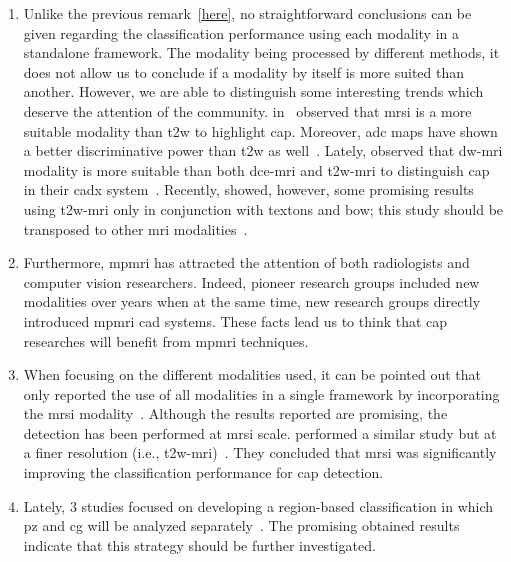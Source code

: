 \begin{enumerate}
\item Unlike the previous remark~\ref{here}, no straightforward conclusions can
  be given regarding the classification performance using each modality in a
  standalone framework.
  The modality being processed by different methods, it does not allow us to
  conclude if a modality by itself is more suited than another.
  However, we are able to distinguish some interesting trends which deserve the
  attention of the community.
  \citeauthor{Tiwari2013} in~\cite{Tiwari2009a,Tiwari2012,Tiwari2013} observed
  that \ac{mrsi} is a more suitable modality than \ac{t2w} to highlight
  \ac{cap}.
  Moreover, \ac{adc} maps have shown a better discriminative power than \ac{t2w}
  as well~\cite{Langer2009,Viswanath2011,Peng2013}.
  Lately, \citeauthor{Litjens2014} observed that \ac{dw}-\ac{mri} modality is
  more suitable than both \ac{dce}-\ac{mri} and \ac{t2w}-\ac{mri} to distinguish
  \ac{cap} in their \ac{cadx} system~\cite{Litjens2014}.
  Recently, \citeauthor{rampun2016computerb} showed, however, some promising
  results using \ac{t2w}-\ac{mri} only in conjunction with textons and \ac{bow};
  this study should be transposed to other \ac{mri}
  modalities~\cite{rampun2016computerb}.

\item Furthermore, \ac{mpmri} has attracted the attention of both radiologists
  and computer vision researchers.
  Indeed, pioneer research groups included new modalities over years when at the
  same time, new research groups directly introduced \ac{mpmri} \ac{cad}
  systems.
  These facts lead us to think that \ac{cap} researches will benefit from
  \ac{mpmri} techniques.

\item When focusing on the different modalities used, it can be pointed out
  that only \citeauthor{trigui2017automatic} reported the use of all modalities
  in a single framework by incorporating the \ac{mrsi}
  modality~\cite{trigui2016classification,trigui2017automatic}.
  Although the results reported are promising, the detection has been performed
  at \ac{mrsi} scale.
  \citeauthor{Lemaitre2016thesis} performed a similar study but at a finer
  resolution (i.e., \ac{t2w}-\ac{mri})~\cite{Lemaitre2016thesis}.
  They concluded that \ac{mrsi} was significantly improving the classification
  performance for \ac{cap} detection.

\item Lately, 3 studies focused on developing a region-based classification in
  which \ac{pz} and \ac{cg} will be analyzed
  separately~\cite{Viswanath2012,Litjens2012,Litjens2014}.
  The promising obtained results indicate that this strategy should be further
  investigated.


\end{enumerate}
